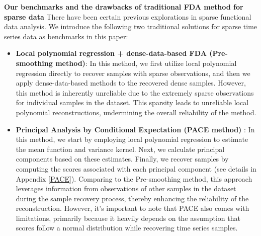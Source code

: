 \documentclass{article}
\begin{document}
\textbf{Our benchmarks and the drawbacks of traditional FDA method for sparse data}
There have been certain previous explorations in sparse functional data analysis. 
We introduce the following two traditional solutions for sparse time series data as benchmarks in this paper:
\begin{itemize}
  \item \textbf{Local polynomial regression + dense-data-based FDA (Pre-smoothing method)}: 
  In this method, we first utilize local polynomial regression directly to recover samples with sparse observations, 
  and then we apply dense-data-based methods to the recovered dense samples. 
  However, this method is inherently unreliable due to the extremely sparse observations for individual samples in the dataset. 
  This sparsity leads to unreliable local polynomial reconstructions, 
  undermining the overall reliability of the method.
  \item \textbf{Principal Analysis by Conditional Expectation (PACE method) }\cite{yao2005functional}: 
  In this method, we start by employing local polynomial regression to estimate the mean function and variance kernel. 
  Next, we calculate principal components based on these estimates. 
  Finally, we recover samples by computing the scores associated with each principal component (see details in Appendix \ref{PACE}).
  Comparing to the Pre-smoothing method, this approach leverages information from observations of other samples in the dataset during the sample recovery process, 
  thereby enhancing the reliability of the reconstruction. 
  However, it's important to note that PACE also comes with limitations, primarily because it heavily depends on the assumption that scores follow a normal distribution while recovering time series samples.
\end{itemize}
\end{document}
